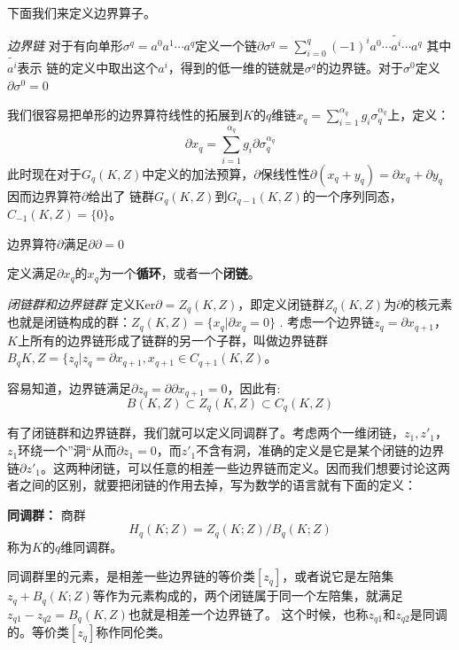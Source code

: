 \documentclass[supercite]{HustGraduPaper}
\begin{document}
\begin{appendices}
		下面我们来定义边界算子。
		
		\textit{边界链} 对于有向单形$\sigma^q = a^0 a^1 \cdots a^q$定义一个链$\partial \sigma^q = \sum_{i=0}^q (-1)^i a^0 \cdots \tilde{a^i} \cdots a^q$ 其中$\tilde{a^i}$表示
		链的定义中取出这个$a^i$，得到的低一维的链就是$\sigma^q$的边界链。对于$\sigma^0$定义$\partial \sigma^0 = 0$
		
		我们很容易把单形的边界算符线性的拓展到$K$的$q$维链$x_q  = \sum_{i= 1}^{\alpha_q} g_i \sigma_q^{\alpha_q }$上，定义：
		\begin{equation}
		\partial x_q = \sum_{i= 1}^{\alpha_q} g_i  \partial \sigma_q^{\alpha_q}
		\end{equation}
		此时现在对于$G_q(K,Z)$中定义的加法预算，$\partial$保线性性$\partial(x_q + y_q) = \partial x_q + \partial y_q$因而边界算符$\partial $给出了
		链群$G_q(K,Z)$到$G_{q-1}(K,Z)$的一个序列同态，$C_{-1}(K,Z) = \{0\}$。
		
		边界算符$\partial$满足$\partial \partial = 0$
		
		定义满足$\partial x_q$的$x_q$为一个\textbf{循环}，或者一个\textbf{闭链}。
		
		\textit{闭链群和边界链群}
		定义$\text{Ker} \partial = Z_q(K,Z)$，即定义闭链群$Z_q(K,Z)$为$\partial$的核元素也就是闭链构成的群：$Z_q(K,Z) = \{x_q | \partial x_q = 0\}$
		.
		考虑一个边界链$z_q = \partial x_{q+1}$，$K$上所有的边界链形成了链群的另一个子群，叫做边界链群$B_q{K,Z} = \{z_q | z_q = \partial x_{q+1}, x_{q+1} \in C_{q+1}(K,Z)$。
		
		容易知道，边界链满足$\partial z_q = \partial \partial x_{q+1} =0$，因此有:
		\begin{equation}
		B(K,Z) \subset Z_q(K,Z) \subset C_q(K,Z)
		\end{equation}
		
		有了闭链群和边界链群，我们就可以定义同调群了。考虑两个一维闭链，$z_1, z'_1$，$z_1$环绕一个”洞“从而$\partial z_1 = 0$，而$z'_1$不含有洞，准确的定义是它是某个闭链的边界链$\partial z'_1$。这两种闭链，可以任意的相差一些边界链而定义。因而我们想要讨论这两者之间的区别，就要把闭链的作用去掉，写为数学的语言就有下面的定义：
		
		\textbf{同调群：} 商群
		\begin{equation}
		H_q(K;Z) = Z_q(K;Z)/B_q(K;Z)
		\end{equation}
		称为$K$的$q$维同调群。
		
		同调群里的元素，是相差一些边界链的等价类$[z_q]$，或者说它是左陪集$z_q + B_q(K;Z)$等作为元素构成的，两个闭链属于同一个左陪集，就满足$z_{q1} - z_{q2} = B_q(K,Z)$也就是相差一个边界链了。 这个时候，也称$z_{q1}$和$z_{q2}$是同调的。等价类$[z_q]$称作同伦类。
		

\end{appendices}
\end{document}

